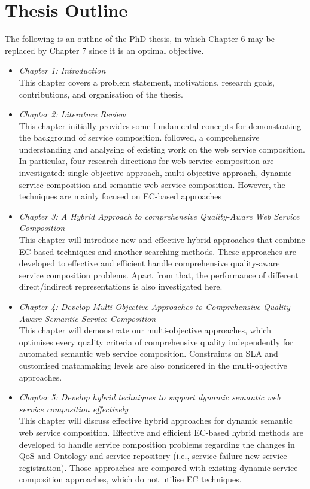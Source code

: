 \section{Thesis Outline}

The following is an outline of the PhD thesis,  in which Chapter 6 may be replaced by Chapter 7 since it is an optimal objective.

\begin{itemize}
 \item \textit{Chapter 1: Introduction}\\
 This chapter covers a problem statement, motivations, research goals, contributions, and organisation of the thesis.
 \item \textit{Chapter 2: Literature Review}\\
This chapter initially provides some fundamental concepts for demonstrating the background of service composition. followed, a comprehensive understanding and analysing of existing work on the web service composition.  In particular, four research directions for web service composition are investigated: single-objective approach, multi-objective approach, dynamic service composition and semantic web service composition.  However, the techniques are mainly focused on EC-based approaches
 \item \textit{Chapter 3: A Hybrid Approach to comprehensive Quality-Aware Web Service Composition}\\
This chapter will introduce new and effective hybrid approaches that combine EC-based techniques and another searching methods. These approaches are developed to effective and efficient handle comprehensive quality-aware service composition problems. Apart from that, the performance of different direct/indirect representations is also investigated here.
 \item \textit{Chapter 4: Develop Multi-Objective Approaches to Comprehensive Quality-Aware Semantic Service Composition}\\
This chapter will demonstrate our multi-objective approaches, which optimises every quality criteria of comprehensive quality independently for automated semantic web service composition. Constraints on SLA and customised matchmaking levels are also considered in the multi-objective approaches.
 \item \textit{Chapter 5: Develop hybrid techniques to support dynamic semantic web service composition effectively}\\
This chapter will discuss effective hybrid approaches for dynamic semantic web service composition. Effective and efficient EC-based hybrid methods are developed to handle service composition problems regarding the changes in QoS and Ontology and service repository (i.e., service failure new service registration). Those approaches are compared with existing dynamic service composition approaches, which do not utilise EC techniques.

\end{itemize}

